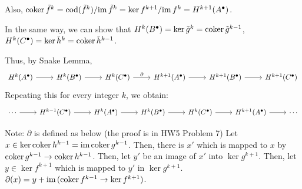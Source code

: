 Also, \(\textnormal{coker}\, \tilde f^k = \textnormal{cod}(\tilde f^k) / \textnormal{im}\, \tilde f^k = \ker f^{k+1} / \textnormal{im}\, f^k = H^{k + 1}(A^\bullet)\).

In the same way, we can show that
\(H^k(B^\bullet) = \ker\tilde g^k = \textnormal{coker}\,\tilde g^{k - 1}\),
\(H^k(C^\bullet) = \ker\tilde h^k = \textnormal{coker}\,\tilde h^{k - 1}\).

Thus, by Snake Lemma,
\[\begin{tikzcd}
  H^k(A^\bullet) \ar{r}
  & H^k(B^\bullet) \ar{r}
  & H^k(C^\bullet) \ar["\partial"]{r}
  & H^{k+1}(A^\bullet) \ar{r}
  & H^{k+1}(B^\bullet) \ar{r}
  & H^{k+1}(C^\bullet)
  \end{tikzcd}\]
Repeating this for every integer \(k\), we obtain:
\[\begin{tikzcd}
  \cdots \ar{r}
  & H^{k - 1}(C^\bullet) \ar{r}
  & H^k(A^\bullet) \ar{r}
  & H^k(B^\bullet) \ar{r}
  & H^k(C^\bullet) \ar{r}
  & H^{k+1}(A^\bullet) \ar{r}
  & \cdots
  \end{tikzcd}\]
\qedsq

Note: \(\partial\) is defined as below (the proof is in HW5 Problem 7)
Let \(x \in \ker\textnormal{coker}\, h^{k-1} = \textnormal{im}\,\textnormal{coker}\, g^{k-1}\).
Then, there is \(x'\) which is mapped to \(x\) by \(\textnormal{coker}\, g^{k-1} \to \textnormal{coker}\, h^{k-1}\).
Then, let \(y'\) be an image of \(x'\) into \(\ker g^{k+1}\).
Then, let \(y \in \ker f^{k+1}\) which is mapped to \(y'\) in \(\ker g^{k+1}\).
\(\partial(x) = y + \textnormal{im}\, (\textnormal{coker}\, f^{k-1} \to \ker f^{k+1})\).